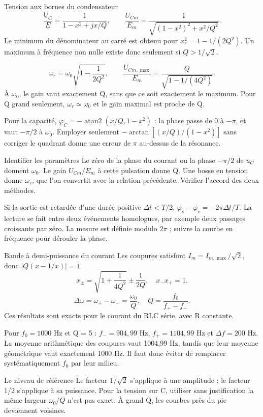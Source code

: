 \begin{loi}{Tension aux bornes du condensateur}
\[\frac{\underline U_C}{\underline E}=\frac1{1-x^2+jx/Q},\qquad \frac{U_{Cm}}{E_m}=\frac1{\sqrt{(1-x^2)^2+x^2/Q^2}}.\]Le minimum du dénominateur au carré est obtenu pour $x_r^2=1-1/(2Q^2)$. Un maximum à fréquence non nulle existe donc seulement si $Q>1/\sqrt2$.
\end{loi}
\[\omega_r=\omega_0\sqrt{1-\frac1{2Q^2}},\qquad \frac{U_{Cm,\max}}{E_m}=\frac Q{\sqrt{1-1/(4Q^2)}}.\]À $\omega_0$, le gain vaut exactement Q, sans que ce soit exactement le maximum. Pour Q grand seulement, $\omega_r\simeq\omega_0$ et le gain maximal est proche de Q.


Pour la capacité, $\varphi_C=-\operatorname{atan2}(x/Q,1-x^2)$ : la phase passe de 0 à $-\pi$, et vaut $-\pi/2$ à $\omega_0$. Employer seulement $-\arctan[(x/Q)/(1-x^2)]$ sans corriger le quadrant donne une erreur de $\pi$ au-dessus de la résonance.
\begin{methode}{Identifier les paramètres}
Le zéro de la phase du courant ou la phase $-\pi/2$ de $u_C$ donnent $\omega_0$. Le gain $U_{Cm}/E_m$ à cette pulsation donne Q. Une bosse en tension donne $\omega_r$, que l’on convertit avec la relation précédente. Vérifier l’accord des deux méthodes.
\end{methode}
Si la sortie est retardée d’une durée positive $\Delta t<T/2$, $\varphi_s-\varphi_e=-2\pi\Delta t/T$. La lecture se fait entre deux événements homologues, par exemple deux passages croissants par zéro. La mesure est définie modulo $2\pi$ ; suivre la courbe en fréquence pour dérouler la phase.


\begin{loi}{Bande à demi-puissance du courant}
Les coupures satisfont $I_m=I_{m,\max}/\sqrt2$, donc $|Q(x-1/x)|=1$.\[x_\pm=\sqrt{1+\frac1{4Q^2}}\pm\frac1{2Q},\quad x_-x_+=1.\]\[\Delta\omega=\omega_+-\omega_-=\frac{\omega_0}{Q},\quad Q=\frac{f_0}{f_+-f_-}.\]Ces résultats sont exacts pour le courant du RLC série, avec R constante.
\end{loi}
Pour $f_0=1000$ Hz et Q = 5 : $f_-=904{,}99$ Hz, $f_+=1104{,}99$ Hz et $\Delta f=200$ Hz. La moyenne arithmétique des coupures vaut 1004,99 Hz, tandis que leur moyenne géométrique vaut exactement 1000 Hz. Il faut donc éviter de remplacer systématiquement $f_0$ par leur milieu.
\begin{piege}{Le niveau de référence}
Le facteur $1/\sqrt2$ s’applique à une amplitude ; le facteur 1/2 s’applique à sa puissance. Pour la tension sur C, utiliser sans justification la même largeur $\omega_0/Q$ n’est pas exact. À grand Q, les courbes près du pic deviennent voisines.
\end{piege}


